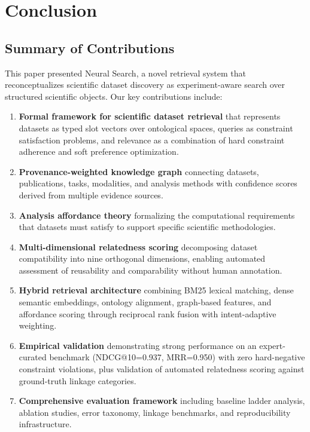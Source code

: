 \documentclass{article}
\theoremstyle{definition}
\begin{document}
\section{Conclusion}
\label{sec:conclusion}

\subsection{Summary of Contributions}

This paper presented Neural Search, a novel retrieval system that reconceptualizes scientific dataset discovery as experiment-aware search over structured scientific objects. Our key contributions include:

\begin{enumerate}
    \item \textbf{Formal framework for scientific dataset retrieval} that represents datasets as typed slot vectors over ontological spaces, queries as constraint satisfaction problems, and relevance as a combination of hard constraint adherence and soft preference optimization.

    \item \textbf{Provenance-weighted knowledge graph} connecting datasets, publications, tasks, modalities, and analysis methods with confidence scores derived from multiple evidence sources.

    \item \textbf{Analysis affordance theory} formalizing the computational requirements that datasets must satisfy to support specific scientific methodologies.

    \item \textbf{Multi-dimensional relatedness scoring} decomposing dataset compatibility into nine orthogonal dimensions, enabling automated assessment of reusability and comparability without human annotation.

    \item \textbf{Hybrid retrieval architecture} combining BM25 lexical matching, dense semantic embeddings, ontology alignment, graph-based features, and affordance scoring through reciprocal rank fusion with intent-adaptive weighting.

    \item \textbf{Empirical validation} demonstrating strong performance on an expert-curated benchmark (NDCG@10=0.937, MRR=0.950) with zero hard-negative constraint violations, plus validation of automated relatedness scoring against ground-truth linkage categories.

    \item \textbf{Comprehensive evaluation framework} including baseline ladder analysis, ablation studies, error taxonomy, linkage benchmarks, and reproducibility infrastructure.
\end{enumerate}
\end{document}

